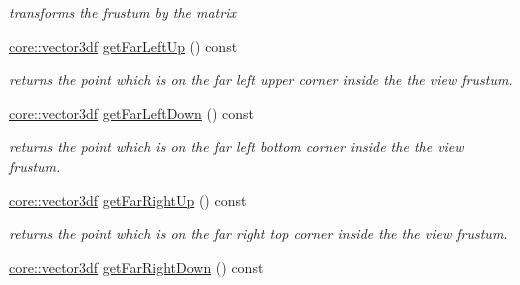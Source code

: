 \begin{DoxyCompactItemize}
\begin{DoxyCompactList}\small\item\em transforms the frustum by the matrix \end{DoxyCompactList}\item 
\mbox{\label{structirr_1_1scene_1_1SViewFrustum_aa88c3024a6d2b5dc67e53014d2632df8}} 
\hyperlink{namespaceirr_1_1core_a06f169d08b5c429f5575acb7edbad811}{core\+::vector3df} \hyperlink{structirr_1_1scene_1_1SViewFrustum_aa88c3024a6d2b5dc67e53014d2632df8}{get\+Far\+Left\+Up} () const
\begin{DoxyCompactList}\small\item\em returns the point which is on the far left upper corner inside the the view frustum. \end{DoxyCompactList}\item 
\mbox{\label{structirr_1_1scene_1_1SViewFrustum_a83216ce3be2990e7e4849bf985d89fd6}} 
\hyperlink{namespaceirr_1_1core_a06f169d08b5c429f5575acb7edbad811}{core\+::vector3df} \hyperlink{structirr_1_1scene_1_1SViewFrustum_a83216ce3be2990e7e4849bf985d89fd6}{get\+Far\+Left\+Down} () const
\begin{DoxyCompactList}\small\item\em returns the point which is on the far left bottom corner inside the the view frustum. \end{DoxyCompactList}\item 
\mbox{\label{structirr_1_1scene_1_1SViewFrustum_a2cce344ced4939aebfe3c9d9396cb4ec}} 
\hyperlink{namespaceirr_1_1core_a06f169d08b5c429f5575acb7edbad811}{core\+::vector3df} \hyperlink{structirr_1_1scene_1_1SViewFrustum_a2cce344ced4939aebfe3c9d9396cb4ec}{get\+Far\+Right\+Up} () const
\begin{DoxyCompactList}\small\item\em returns the point which is on the far right top corner inside the the view frustum. \end{DoxyCompactList}\item 
\mbox{\label{structirr_1_1scene_1_1SViewFrustum_ab1bf1b3cf323812ed4259268ce7ecf76}} 
\hyperlink{namespaceirr_1_1core_a06f169d08b5c429f5575acb7edbad811}{core\+::vector3df} \hyperlink{structirr_1_1scene_1_1SViewFrustum_ab1bf1b3cf323812ed4259268ce7ecf76}{get\+Far\+Right\+Down} () const

\end{DoxyCompactItemize}
